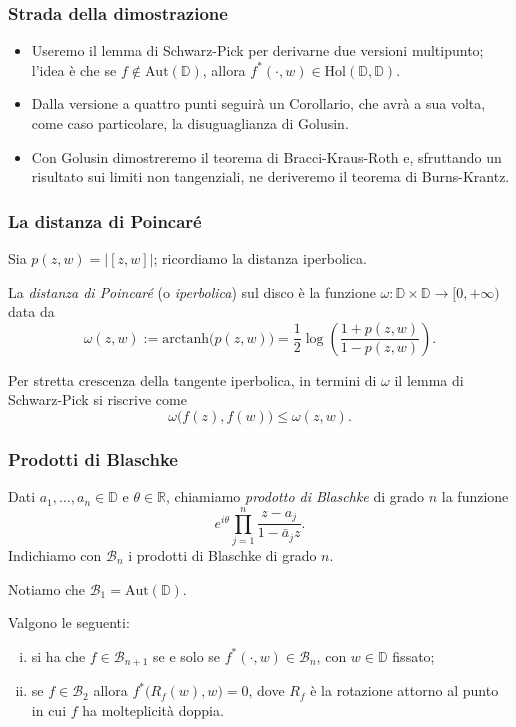 \begin{frame}
  \frametitle{Strada della dimostrazione}
  \begin{itemize}
    \item Useremo il lemma di Schwarz-Pick per derivarne due versioni multipunto; l'idea è che se $f \not\in \text{Aut}(\mathbb{D})$, allora $f^*(\cdot,w) \in \text{Hol}(\mathbb{D},\mathbb{D})$.
    \pause
    \item Dalla versione a quattro punti seguirà un Corollario, che avrà a sua volta, come caso particolare, la disuguaglianza di Golusin.
    \pause
    \item Con Golusin dimostreremo il teorema di Bracci-Kraus-Roth e, sfruttando un risultato sui limiti non tangenziali, ne deriveremo il teorema di Burns-Krantz.
  \end{itemize}
\end{frame}

\begin{frame}
  \frametitle{La distanza di Poincaré}
  Sia $p(z,w)=|[z,w]|$; ricordiamo la distanza iperbolica. \pause
  \begin{defn}
    La \textit{distanza di Poincaré} (o \textit{iperbolica}) sul disco è la funzione $\omega:\mathbb{D}\times \mathbb{D} \longrightarrow [0,+\infty)$ data da
    $$\omega(z,w):=\text{arctanh}\bigl(p(z,w)\bigr)=\frac{1}{2}\log\left(\frac{1+p(z,w)}{1-p(z,w)}\right).$$
  \end{defn}
  \pause
  Per stretta crescenza della tangente iperbolica, in termini di $\omega$ il lemma di Schwarz-Pick si riscrive come
  $$\omega\bigl(f(z),f(w)\bigr) \le \omega(z,w).$$
\end{frame}

\begin{frame}
  \frametitle{Prodotti di Blaschke}
  \begin{defn}
    Dati $a_1,\dots,a_n \in \mathbb{D}$ e $\theta \in \mathbb{R}$, chiamiamo \textit{prodotto di Blaschke} di grado $n$ la funzione
    $$e^{i\theta}\prod_{j=1}^n \frac{z-a_j}{1-\bar{a}_jz}.$$
    Indichiamo con $\mathcal{B}_n$ i prodotti di Blaschke di grado $n$.
  \end{defn}
  \pause
  Notiamo che $\mathcal{B}_1=\text{Aut}(\mathbb{D})$.
  \pause
  \begin{prop}
    Valgono le seguenti:
    \begin{enumerate}[(i)]
      \item si ha che $f \in \mathcal{B}_{n+1}$ se e solo se $f^*(\cdot,w) \in \mathcal{B}_n$, con $w \in \mathbb{D}$ fissato;
      \item se $f \in \mathcal{B}_2$ allora $f^*\bigl(R_f(w),w\bigr)=0$, dove $R_f$ è la rotazione attorno al punto in cui $f$ ha molteplicità doppia.
    \end{enumerate}
  \end{prop}
\end{frame}

